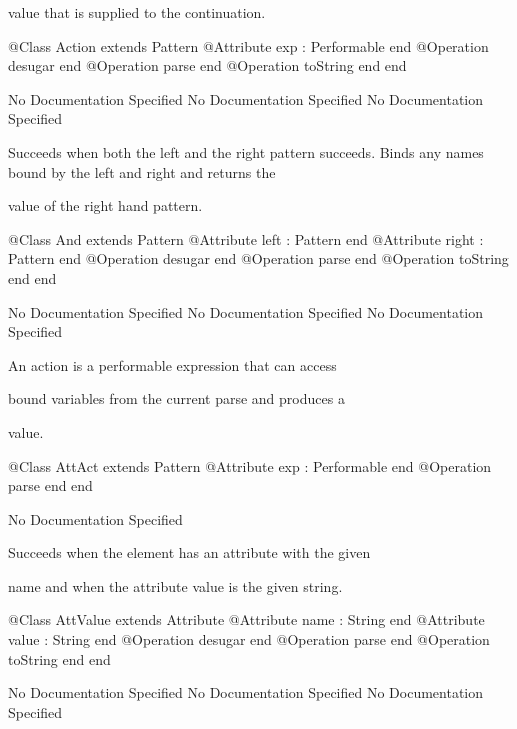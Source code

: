       value that is supplied to the continuation.
\begin{Interface}
@Class Action extends Pattern
  @Attribute exp : Performable end
  @Operation desugar end
  @Operation parse end
  @Operation toString end
end
\end{Interface}
No Documentation Specified
No Documentation Specified
No Documentation Specified

      Succeeds when both the left and the right pattern succeeds.
      Binds any names bound by the left and right and returns the

      value of the right hand pattern.
\begin{Interface}
@Class And extends Pattern
  @Attribute left : Pattern end
  @Attribute right : Pattern end
  @Operation desugar end
  @Operation parse end
  @Operation toString end
end
\end{Interface}
No Documentation Specified
No Documentation Specified
No Documentation Specified

      An action is a performable expression that can access

      bound variables from the current parse and produces a

      value.
\begin{Interface}
@Class AttAct extends Pattern
  @Attribute exp : Performable end
  @Operation parse end
end
\end{Interface}
No Documentation Specified

      Succeeds when the element has an attribute with the given

      name and when the attribute value is the given string.
\begin{Interface}
@Class AttValue extends Attribute
  @Attribute name : String end
  @Attribute value : String end
  @Operation desugar end
  @Operation parse end
  @Operation toString end
end
\end{Interface}
No Documentation Specified
No Documentation Specified
No Documentation Specified

